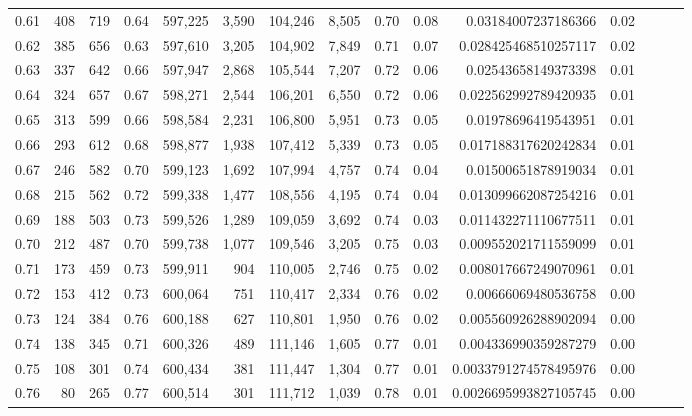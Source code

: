 \begin{tabular}{rrrrrrrrrrrrrrr}
0.61 &     408 &    719 &  0.64 &  597,225 &    3,590 &  104,246 &    8,505 &  0.70 &  0.08 &     0.03184007237186366 &      0.02 \\
0.62 &     385 &    656 &  0.63 &  597,610 &    3,205 &  104,902 &    7,849 &  0.71 &  0.07 &    0.028425468510257117 &      0.02 \\
0.63 &     337 &    642 &  0.66 &  597,947 &    2,868 &  105,544 &    7,207 &  0.72 &  0.06 &     0.02543658149373398 &      0.01 \\
0.64 &     324 &    657 &  0.67 &  598,271 &    2,544 &  106,201 &    6,550 &  0.72 &  0.06 &    0.022562992789420935 &      0.01 \\
0.65 &     313 &    599 &  0.66 &  598,584 &    2,231 &  106,800 &    5,951 &  0.73 &  0.05 &     0.01978696419543951 &      0.01 \\
0.66 &     293 &    612 &  0.68 &  598,877 &    1,938 &  107,412 &    5,339 &  0.73 &  0.05 &    0.017188317620242834 &      0.01 \\
0.67 &     246 &    582 &  0.70 &  599,123 &    1,692 &  107,994 &    4,757 &  0.74 &  0.04 &     0.01500651878919034 &      0.01 \\
0.68 &     215 &    562 &  0.72 &  599,338 &    1,477 &  108,556 &    4,195 &  0.74 &  0.04 &    0.013099662087254216 &      0.01 \\
0.69 &     188 &    503 &  0.73 &  599,526 &    1,289 &  109,059 &    3,692 &  0.74 &  0.03 &    0.011432271110677511 &      0.01 \\
0.70 &     212 &    487 &  0.70 &  599,738 &    1,077 &  109,546 &    3,205 &  0.75 &  0.03 &    0.009552021711559099 &      0.01 \\
0.71 &     173 &    459 &  0.73 &  599,911 &      904 &  110,005 &    2,746 &  0.75 &  0.02 &    0.008017667249070961 &      0.01 \\
0.72 &     153 &    412 &  0.73 &  600,064 &      751 &  110,417 &    2,334 &  0.76 &  0.02 &     0.00666069480536758 &      0.00 \\
0.73 &     124 &    384 &  0.76 &  600,188 &      627 &  110,801 &    1,950 &  0.76 &  0.02 &    0.005560926288902094 &      0.00 \\
0.74 &     138 &    345 &  0.71 &  600,326 &      489 &  111,146 &    1,605 &  0.77 &  0.01 &    0.004336990359287279 &      0.00 \\
0.75 &     108 &    301 &  0.74 &  600,434 &      381 &  111,447 &    1,304 &  0.77 &  0.01 &   0.0033791274578495976 &      0.00 \\
0.76 &      80 &    265 &  0.77 &  600,514 &      301 &  111,712 &    1,039 &  0.78 &  0.01 &   0.0026695993827105745 &      0.00 \\

\end{tabular}
